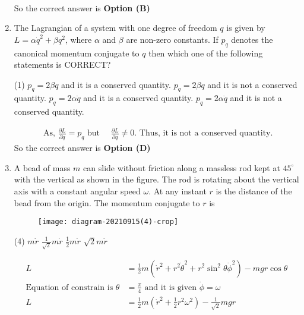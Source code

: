 \begin{enumerate}
\begin{answer}
\begin{align*}
\end{align*}
So the correct answer is \textbf{Option (B)}
\end{answer}	
\item The Lagrangian of a system with one degree of freedom $q$ is given by $L=\alpha \dot{q}^{2}+\beta q^{2}$, where $\alpha$ and $\beta$ are non-zero constants. If $p_{q}$ denotes the canonical momentum conjugate to $q$ then which one of the following statements is CORRECT?
{}
\begin{tasks}(1)
\task[\textbf{A.}] $p_{q}=2 \beta q$ and it is a conserved quantity.
\task[\textbf{B.}]  $p_{q}=2 \beta q$ and it is not a conserved quantity.
\task[\textbf{C.}] $p_{q}=2 \alpha \dot{q}$ and it is a conserved quantity.
\task[\textbf{D.}]  $p_{q}=2 \alpha \dot{q}$ and it is not a conserved quantity.
\end{tasks}
\begin{answer}
\begin{align*}
\text{	As, }\frac{\partial L}{\partial \dot{q}}=p_{q}\text{ but }\quad \frac{\partial L}{\partial q} \neq 0.\text{ Thus, it is not a conserved quantity.}
\end{align*}
So the correct answer is \textbf{Option (D)}
\end{answer}	
\item A bead of mass $m$ can slide without friction along a massless rod kept at $45^{\circ}$ with the vertical as shown in the figure. The rod is rotating about the vertical axis with a constant angular speed $\omega$. At any instant $r$ is the distance of the bead from the origin. The momentum conjugate to $r$ is
{}
\begin{figure}[H]
\centering
\texttt{[image: diagram-20210915(4)-crop]}
\end{figure}
\begin{tasks}(4)
\task[\textbf{A.}] $m \dot{r}$
\task[\textbf{B.}] $\frac{1}{\sqrt{2}} m \dot{r}$
\task[\textbf{C.}] $\frac{1}{2} m \dot{r}$
\task[\textbf{D.}] $\sqrt{2} m \dot{r}$
\end{tasks}
\begin{answer}
\begin{align*}
L&=\frac{1}{2} m\left(\dot{r}^{2}+r^{2} \dot{\theta}^{2}+r^{2} \sin ^{2} \theta \dot{\phi}^{2}\right)-m g r \cos \theta\\
\text{Equation of constrain is }\theta&=\frac{\pi}{4}\text{ and it is given } \dot{\phi}=\omega\\
L&=\frac{1}{2} m\left(\dot{r}^{2}+\frac{1}{2} r^{2} \omega^{2}\right)-\frac{1}{\sqrt{2}} m g r\\

\end{align*}
\end{answer}
\end{enumerate}
